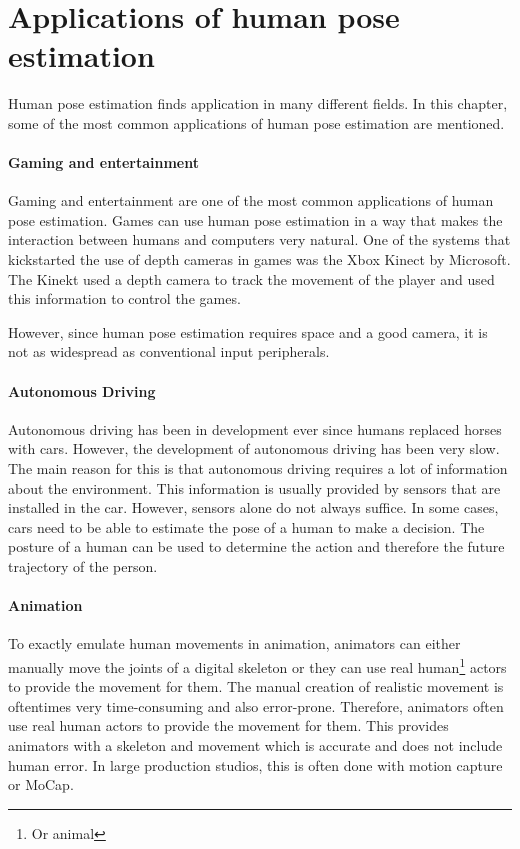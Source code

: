 \section{Applications of human pose estimation}
Human pose estimation finds application in many different fields. In this chapter, some of the most common applications of human pose estimation are mentioned.

\paragraph{Gaming and entertainment}

Gaming and entertainment are one of the most common applications of human pose estimation. Games can use human pose estimation in a way that makes the interaction between humans and computers very natural. One of the systems that kickstarted the use of depth cameras in games was the Xbox Kinect by Microsoft. The Kinekt used a depth camera to track the movement of the player and used this information to control the games.

However, since human pose estimation requires space and a good camera, it is not as widespread as conventional input peripherals.

\paragraph{Autonomous Driving}

Autonomous driving has been in development ever since humans replaced horses with cars\cite{OldAutoDrive}. However, the development of autonomous driving has been very slow. The main reason for this is that autonomous driving requires a lot of information about the environment. This information is usually provided by sensors that are installed in the car. However, sensors alone do not always suffice. In some cases, cars need to be able to estimate the pose of a human to make a decision. The posture of a human can be used to determine the action and therefore the future trajectory of the person. 

\paragraph{Animation}

To exactly emulate human movements in animation, animators can either manually move the joints of a digital skeleton or they can use real human\footnote{Or animal} actors to provide the movement for them. The manual creation of realistic movement is oftentimes very time-consuming and also error-prone. Therefore, animators often use real human actors to provide the movement for them. This provides animators with a skeleton and movement which is accurate and does not include human error. In large production studios, this is often done with motion capture or MoCap. 

